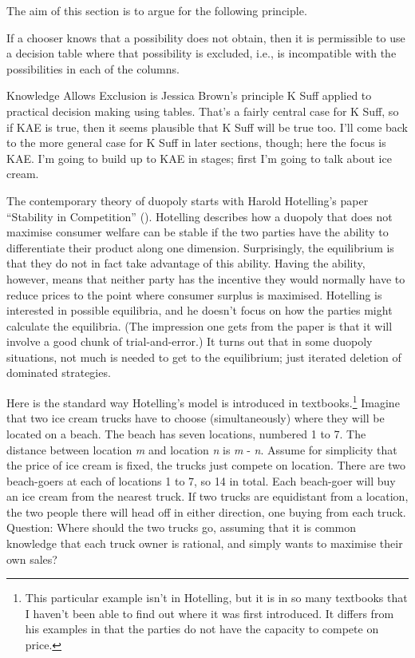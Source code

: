 \documentclass[
  12pt,
  letterpaper,
]{scrbook}
\providecommand{\tightlist}{%
  \setlength{\itemsep}{0pt}\setlength{\parskip}{0pt}}\usepackage{longtable,booktabs,array}
\begin{document}
The aim of this section is to argue for the following principle.

\begin{description}
\tightlist
\item[Knowledge Allows Exclusion (KAE)]
If a chooser knows that a possibility does not obtain, then it is
permissible to use a decision table where that possibility is excluded,
i.e., is incompatible with the possibilities in each of the columns.
\end{description}

Knowledge Allows Exclusion is Jessica Brown's principle K Suff applied
to practical decision making using tables. That's a fairly central case
for K Suff, so if KAE is true, then it seems plausible that K Suff will
be true too. I'll come back to the more general case for K Suff in later
sections, though; here the focus is KAE. I'm going to build up to KAE in
stages; first I'm going to talk about ice cream.

The contemporary theory of duopoly starts with Harold Hotelling's paper
``Stability in Competition'' ().
Hotelling describes how a duopoly that does not maximise consumer
welfare can be stable if the two parties have the ability to
differentiate their product along one dimension. Surprisingly, the
equilibrium is that they do not in fact take advantage of this ability.
Having the ability, however, means that neither party has the incentive
they would normally have to reduce prices to the point where consumer
surplus is maximised. Hotelling is interested in possible equilibria,
and he doesn't focus on how the parties might calculate the equilibria.
(The impression one gets from the paper is that it will involve a good
chunk of trial-and-error.) It turns out that in some duopoly situations,
not much is needed to get to the equilibrium; just iterated deletion of
dominated strategies.

Here is the standard way Hotelling's model is introduced in
textbooks.\footnote{This particular example isn't in Hotelling, but it
  is in so many textbooks that I haven't been able to find out where it
  was first introduced. It differs from his examples in that the parties
  do not have the capacity to compete on price.} Imagine that two ice
cream trucks have to choose (simultaneously) where they will be located
on a beach. The beach has seven locations, numbered 1 to 7. The distance
between location \emph{m} and location \emph{n} is \textbar{}\emph{m} -
\emph{n}\textbar. Assume for simplicity that the price of ice cream is
fixed, the trucks just compete on location. There are two beach-goers at
each of locations 1 to 7, so 14 in total. Each beach-goer will buy an
ice cream from the nearest truck. If two trucks are equidistant from a
location, the two people there will head off in either direction, one
buying from each truck. Question: Where should the two trucks go,
assuming that it is common knowledge that each truck owner is rational,
and simply wants to maximise their own sales?
\end{document}
